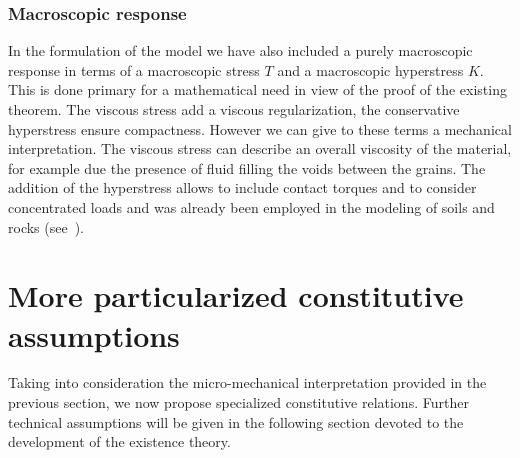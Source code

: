 \documentclass[a4paper,10pt,twoside]{amsbook}
\numberwithin{section}{chapter}
\numberwithin{equation}{chapter}
\theoremstyle{definition}
\begin{document}
\subsubsection*{Macroscopic response}

In the formulation of the model we have also included a purely macroscopic response in terms of a macroscopic stress $T$ and a macroscopic hyperstress $K$. This is done primary for a mathematical need in view of the proof of the existing theorem. The viscous stress add a viscous regularization, the conservative hyperstress ensure compactness. However we can give to these terms a mechanical interpretation. The viscous stress can describe an overall viscosity of the material, for example due the presence of fluid filling the voids between the grains. The addition of the hyperstress allows to include contact torques and to consider concentrated loads and was already been employed in the modeling of soils and rocks (see~\cite[Chapter 10]{bifurcation-geomechanics}).

\section{More particularized constitutive assumptions}
\label{sec:particular-constitutive}

Taking into consideration the micro-mechanical interpretation provided in the previous section, we now propose specialized constitutive relations. Further technical assumptions will be given in the following section devoted to the development of the existence theory.
\end{document}

